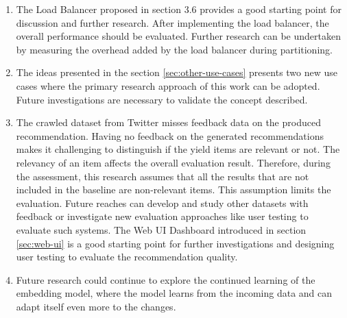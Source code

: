 \begin{enumerate}
    \item The Load Balancer proposed in section 3.6 provides a good starting point for discussion and further research. After implementing the load balancer, the overall performance should be evaluated. Further research can be undertaken by measuring the overhead added by the load balancer during partitioning.
    
    \item The ideas presented in the section \ref{sec:other-use-cases} presents two new use cases where the primary research approach of this work can be adopted. Future investigations are necessary to validate the concept described.
    
    \item The crawled dataset from Twitter misses feedback data on the produced recommendation. Having no feedback on the generated recommendations makes it challenging to distinguish if the yield items are relevant or not. The relevancy of an item affects the overall evaluation result. Therefore, during the assessment, this research assumes that all the results that are not included in the baseline are non-relevant items. This assumption limits the evaluation. Future reaches can develop and study other datasets with feedback or investigate new evaluation approaches like user testing to evaluate such systems. The Web UI Dashboard introduced in section \ref{sec:web-ui} is a good starting point for further investigations and designing user testing to evaluate the recommendation quality.
    
    \item Future research could continue to explore the continued learning of the embedding model, where the model learns from the incoming data and can adapt itself even more to the changes. 
\end{enumerate}